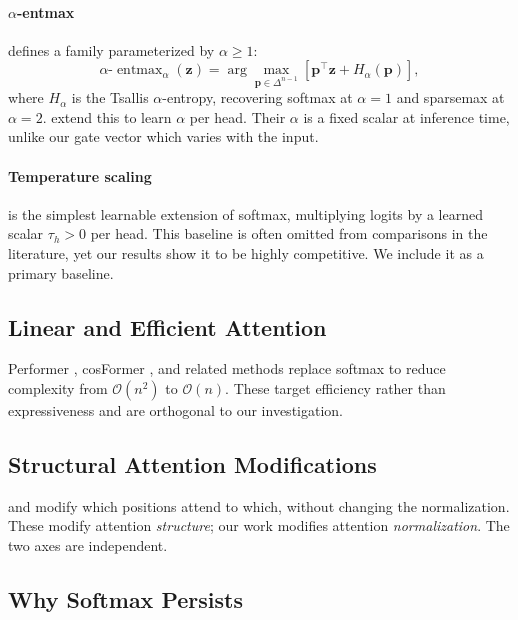 \documentclass[11pt]{article}
\newcommand{\entmax}{\alpha\text{-}\operatorname{entmax}}
\newcommand{\bp}{\mathbf{p}}
\newcommand{\bz}{\mathbf{z}}
\begin{document}
\paragraph{$\alpha$-entmax} \citep{peters2019sparse} defines a family parameterized by $\alpha \geq 1$:
\begin{equation}
  \entmax_\alpha(\bz)
    = \arg\max_{\bp \in \Delta^{n-1}}
      \!\left[ \bp^\top \bz + H_\alpha(\bp) \right],
\end{equation}
where $H_\alpha$ is the Tsallis $\alpha$-entropy, recovering softmax at $\alpha=1$ and sparsemax at $\alpha=2$. \citet{correia2019adaptively} extend this to learn $\alpha$ per head. Their $\alpha$ is a fixed scalar at inference time, unlike our gate vector which varies with the input.

\paragraph{Temperature scaling} is the simplest learnable extension of softmax, multiplying logits by a learned scalar $\tau_h > 0$ per head. This baseline is often omitted from comparisons in the literature, yet our results show it to be highly competitive. We include it as a primary baseline.

\subsection{Linear and Efficient Attention}

Performer \citep{choromanski2021rethinking}, cosFormer \citep{qin2022cosformer}, and related methods replace softmax to reduce complexity from $\mathcal{O}(n^2)$ to $\mathcal{O}(n)$. These target efficiency rather than expressiveness and are orthogonal to our investigation.

\subsection{Structural Attention Modifications}

\citet{wu2019pay} and \citet{child2019generating} modify which positions attend to which, without changing the normalization. These modify attention \emph{structure}; our work modifies attention \emph{normalization}. The two axes are independent.

\subsection{Why Softmax Persists}
\end{document}

